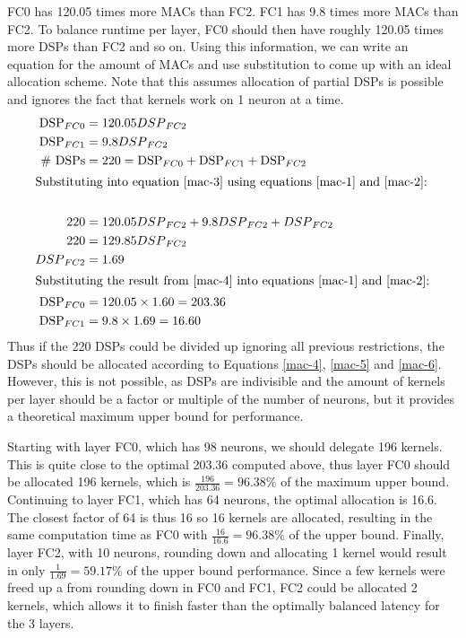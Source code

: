 FC0 has 120.05 times more MACs than FC2. FC1 has 9.8 times more MACs than FC2. To balance runtime per layer, FC0 should then have roughly 120.05 times more DSPs than FC2 and so on. Using this information, we can write an equation for the amount of MACs and use substitution to come up with an ideal allocation scheme. Note that this assumes allocation of partial DSPs is possible and ignores the fact that kernels work on 1 neuron at a time.
\begin{align}
	\text{DSP}_{FC0} &= 120.05 {DSP}_{FC2} \label{mac-1}\\	
	\text{DSP}_{FC1} &= 9.8 {DSP}_{FC2} \label{mac-2}\\
	\text{\# DSPs} &= 220 = \text{DSP}_{FC0} + \text{DSP}_{FC1} + \text{DSP}_{FC2} \label{mac-3}\\	
	\intertext{Substituting into equation \ref{mac-3} using equations \ref{mac-1} and \ref{mac-2}:}\\
	220 &= 120.05 {DSP}_{FC2} + 9.8  {DSP}_{FC2} +  {DSP}_{FC2} \\
	220 &= 129.85 {DSP}_{FC2}\\ 
	{DSP}_{FC2} &= 1.69 \label{mac-4}\\
	\intertext{Substituting the result from \ref{mac-4} into equations \ref{mac-1} and \ref{mac-2}:}
	\text{DSP}_{FC0} &= 120.05 \times 1.60 = 203.36\label{mac-5}\\	
	\text{DSP}_{FC1} &= 9.8 \times 1.69 = 16.60\label{mac-6}	
\end{align}
Thus if the 220 DSPs could be divided up ignoring all previous restrictions, the DSPs should be allocated according to Equations \ref{mac-4}, \ref{mac-5} and \ref{mac-6}. However, this is not possible, as DSPs are indivisible and the amount of kernels per layer should be a factor or multiple of the number of neurons, but it provides a theoretical maximum upper bound for performance.

Starting with layer FC0, which has 98 neurons, we should delegate 196 kernels. This is quite close to the optimal 203.36 computed above, thus layer FC0 should be allocated 196 kernels, which is $\frac{196}{203.36} = 96.38\%$ of the maximum upper bound. Continuing to layer FC1, which has 64 neurons, the optimal allocation is 16.6. The closest factor of 64 is thus 16 so 16 kernels are allocated, resulting in the same computation time as FC0 with $\frac{16}{16.6} = 96.38\%$ of the upper bound. Finally, layer FC2, with 10 neurons, rounding down and allocating 1 kernel would result in only $\frac{1}{1.69} = 59.17\%$ of the upper bound performance. Since a few kernels were freed up a from rounding down in FC0 and FC1, FC2 could be allocated 2 kernels, which allows it to finish faster than the optimally balanced latency for the 3 layers.

